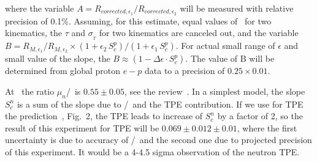 where the variable $A = R_{{corrected},\epsilon_1}/R_{{corrected},\epsilon_2}$ will be measured with relative precision of 0.1\%.  
Assuming, for this estimate, equal values of \qsq~for two kinematics, the  $\tau$ and $\sigma_{_T}$ for two kinematics are canceled out, and the variable
\mbox{$ B = {R_{M,\epsilon_1}}/{R_{M,\epsilon_2}} \times (1+ \epsilon_2 \, S_c^p)/( 1 + \epsilon_1 \, S_c^p)$}.
For actual small range of $\epsilon$ and small value of the slope, the $B \approx (1 - \Delta \epsilon \cdot S_c^p)$.
The value of B will be determined from global proton $e-p$ data to a precision of $0.25 \times 0.01$.
 
At  \gevcsq~the ratio $\mu_n$\gen/\gmn~is $0.55 \pm 0.05$, see the review~\cite{Punjabi:2015bba}.
%
In a simplest model, the slope $S_c^n$ is a sum of the slope due to \gen/\gmn~and the TPE contribution.
If we use for TPE the prediction~\cite{Blunden:2005ew}, Fig.~2, the TPE leads to increase of $S_c^n$ by a factor of 2,
so the result of this experiment for TPE will be $0.069 \pm 0.012 \pm 0.01$, where the first uncertainty is due to accuracy 
of \gen/\gmn~and the second one due to projected precision of this experiment. It would be a 4-4.5 sigma observation of the neutron TPE.
